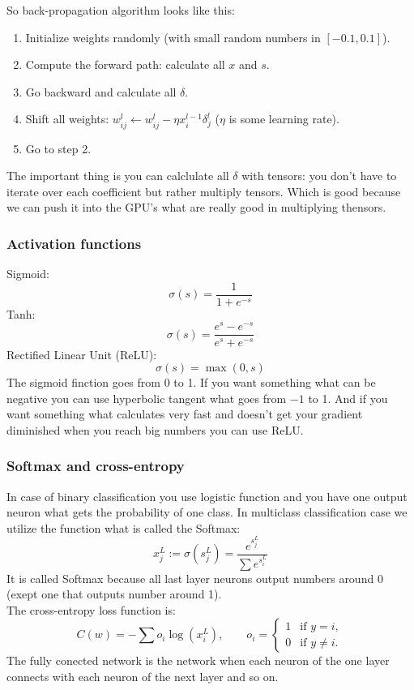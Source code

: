So back-propagation algorithm looks like this:
\begin{enumerate}[label=\arabic*.]
  \item Initialize weights randomly (with small random numbers in $[-0.1,0.1]$).
  \item Compute the forward path: calculate all $x$ and $s$.
  \item Go backward and calculate all $\delta$.
  \item Shift all weights: $w_{ij}^l\leftarrow w_{ij}^l-\eta x_i^{l-1}\delta_j^l$ ($\eta$ is some learning rate).
  \item Go to step 2.
\end{enumerate}
The important thing is you can calclulate all $\delta$ with tensors: you don't have to iterate over each coefficient but rather multiply tensors. Which is good because we can push it into the GPU's what are really good in multiplying thensors.

\subsubsection*{Activation functions}

Sigmoid: 
$$\sigma(s)=\frac{1}{1+e^{-s}}$$
Tanh:
$$\sigma(s)=\frac{e^s-e^{-s}}{e^s+e^{-s}}$$
Rectified Linear Unit (ReLU):
$$\sigma(s)=\max(0,s)$$
The sigmoid finction goes from 0 to 1. If you want something what can be negative you can use hyperbolic tangent what goes from $-1$ to 1. And if you want something what calculates very fast and doesn't get your gradient diminished when you reach big numbers you can use ReLU.

\subsubsection*{Softmax and cross-entropy}

In case of binary classification you use logistic function and you have one output neuron what gets the probability of one class. In multiclass classification case we utilize the function what is called the Softmax:
$$x_j^L:=\sigma(s_j^L)=\frac{e^{s_j^L}}{\sum e^{s_i^L}}$$
It is called Softmax because all last layer neurons output numbers around 0 (exept one that outputs number around 1).\\
The cross-entropy loss function is:
$$C(w)=-\sum o_i\log(x_i^L),\qquad o_i=\begin{cases}
1&\text{if }y=i,\\
0&\text{if }y\ne i.
\end{cases}$$
The fully conected network is the network when each neuron of the one layer connects with each neuron of the next layer and so on.

